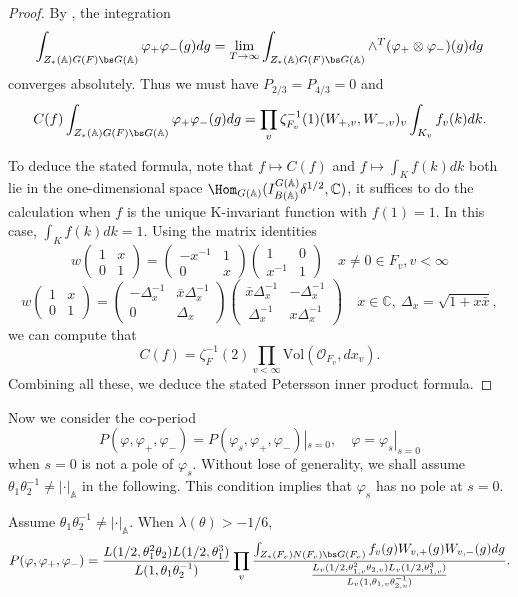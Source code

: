 \documentclass[11pt,reqno]{amsart}
\newcommand{\BA}{{\mathbb {A}}} \newcommand{\BB}{{\mathbb {B}}}
\newcommand{\BC}{{\mathbb {C}}} \newcommand{\BD}{{\mathbb {D}}}
\newcommand{\CO}{{\mathcal {O}}} \newcommand{\CP}{{\mathcal {P}}}
\newcommand{\Vol}{{\mathrm{Vol}}}\newcommand{\vol}{{\mathrm{vol}}}
\theoremstyle{plain}
\theoremstyle{remark} \newtheorem{remark}[thm]{Remark}
\theoremstyle{definition} \newtheorem{exercise}[thm]{Exercise}
\theoremstyle{definition} \newtheorem{example}[thm]{Example} \newtheorem{condition}[thm]{Condition}
\numberwithin{equation}{section}
\renewcommand{\-}{\text{--}}
\begin{document}
\begin{proof}
 By  \cite[Page 115-116]{KP84}, the integration \[\int_{Z_*(\BA)G(F)\bs G(\BA)}\varphi_+\varphi_-(g)dg=\lim_{T\to\infty} \int_{Z_*(\BA)G(F)\bs G(\BA)}\wedge^T(\varphi_+ \otimes\varphi_-)(g)dg\]converges absolutely. Thus we must have $P_{2/3}=P_{4/3}=0$ and 
\[C(f)\int_{Z_*(\BA)G(F)\bs G(\BA)}\varphi_+\varphi_-(g)dg=\prod_v\zeta_{F_v}^{-1}(1)(W_{+,v}, W_{-,v})_v\int_{K_v}f_v(k)dk.\]

To deduce the stated formula,  note that $f\mapsto C(f)$ and $f\mapsto \int_Kf(k)dk$ both lie in the one-dimensional space $\Hom_{G(\BA)}(I_{B(\BA)}^{G(\BA)}\delta^{1/2},\BC)$, it suffices to do the calculation when $f$ is the unique K-invariant function with $f(1)=1$. In this case, $\int_Kf(k)dk=1$. Using the matrix identities 
 \[w\begin{pmatrix} 1 & x \\ 0 & 1\end{pmatrix}=\begin{pmatrix}-x^{-1} & 1\\ 0 & x\end{pmatrix}\begin{pmatrix} 1 & 0\\ x^{-1} & 1\end{pmatrix}\quad x\neq0\in F_v, v<\infty\]
  \[w\begin{pmatrix} 1 & x \\ 0 & 1\end{pmatrix}=\begin{pmatrix}-\Delta_x^{-1} & \bar{x}\Delta_x^{-1}\\ 0 & \Delta_x\end{pmatrix}\begin{pmatrix} \bar{x}\Delta_x^{-1} & -\Delta_x^{-1}\\\ \Delta_x^{-1} & x\Delta_x^{-1}\end{pmatrix}\quad x\in \BC,\ \Delta_x=\sqrt{1+x\bar{x}},\]
 we can compute that  \[C(f)=\zeta_F^{-1}(2)\prod_{v<\infty}\Vol(\CO_{F_v}, dx_v).\]
 Combining all these, we deduce the stated Petersson inner product formula.
\end{proof}
Now  we  consider the co-period 
\[P(\varphi,\varphi_+,\varphi_{-})=P(\varphi_s,\varphi_+,\varphi_{-})|_{s=0},\quad \varphi=\varphi_s|_{s=0}\]
when $s=0$ is not a pole of $\varphi_s$. Without lose of generality,   we shall assume $\theta_1\theta_2^{-1}\neq|\cdot|_\BA$ in the following. This condition implies that   $\varphi_s$ has no pole at $s=0$. \begin{prop}\label{EisenI}Assume  $\theta_1\theta_2^{-1}\neq|\cdot|_\BA$. When   $\lambda(\theta)>-1/6$,
\[P(\varphi,\varphi_+,\varphi_{-})=\frac{L(1/2,\theta_1^2\theta_2)L(1/2,\theta_1^3)}{L(1,\theta_1\theta_2^{-1})}\prod_{v}\frac{\int_{Z_*(F_v)N(F_v)\bs G(F_v)}f_v(g)W_{v,+}(g)W_{v,-}(g)dg}{\frac{L_v(1/2,\theta_{1,v}^2\theta_{2,v})L_v(1/2,\theta_{1,v}^3)}{L_v(1,\theta_{1,v}\theta_{2,v}^{-1})}}.\]
\end{prop}
\end{document}
